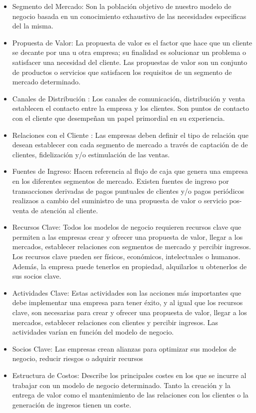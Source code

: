 \begin{itemize}
    \item Segmento del Mercado: Son la población objetivo de nuestro modelo de negocio basada en un conocimiento exhaustivo de las necesidades especificas del la misma.
    
    \item Propuesta de Valor: La propuesta de valor es el factor que hace que un cliente se decante por una u otra empresa; su finalidad es solucionar un  problema o satisfacer una necesidad del cliente. Las propuestas  de valor son un conjunto de productos o servicios que satisfacen los requisitos de un segmento de mercado determinado. 
    \item Canales de Distribución : Los canales de comunicación, distribución y venta establecen el contacto entre la empresa y los clientes. Son puntos de contacto con  el cliente que desempeñan un papel primordial en su experiencia. 
    \item Relaciones con el Cliente : Las empresas deben definir el tipo de relación que desean establecer con cada segmento de mercado a través de captación de de clientes, fidelización y/o estimulación de las ventas. 
    \item Fuentes de Ingreso: Hacen referencia al flujo de caja que genera una empresa en los diferentes segmentos de mercado. Existen fuentes de ingreso por transacciones derivadas de pagos puntuales de clientes y/o pagos periódicos realizaos a cambio del suministro de una propuesta de valor o servicio pos-venta de atención al cliente. 
    \item Recursos Clave: Todos los modelos de negocio requieren recursos clave que  permiten a las empresas crear y ofrecer una propuesta de valor, llegar a los mercados, establecer relaciones con segmentos de  mercado y percibir ingresos. Los recursos clave pueden ser físicos, económicos, intelectuales o humanos. Además, la empresa puede tenerlos en propiedad, alquilarlos u obtenerlos de sus socios clave.
    \item Actividades Clave:  Estas actividades son las acciones más importantes que debe implementar una empresa para tener éxito, y al igual que los recursos clave, son necesarias para crear y ofrecer una propuesta de valor, llegar a los mercados, establecer relaciones con clientes y percibir ingresos. Las actividades varían en función del modelo de negocio.
    \item Socios Clave: Las empresas crean alianzas para optimizar sus modelos de negocio, reducir riesgos o adquirir recursos
    \item Estructura de Costos: Describe los principales costes en los que se incurre al trabajar con un modelo de negocio determinado. Tanto la creación y la entrega de valor como el mantenimiento de las relaciones con los clientes o la generación de ingresos tienen un coste.
\end{itemize}
